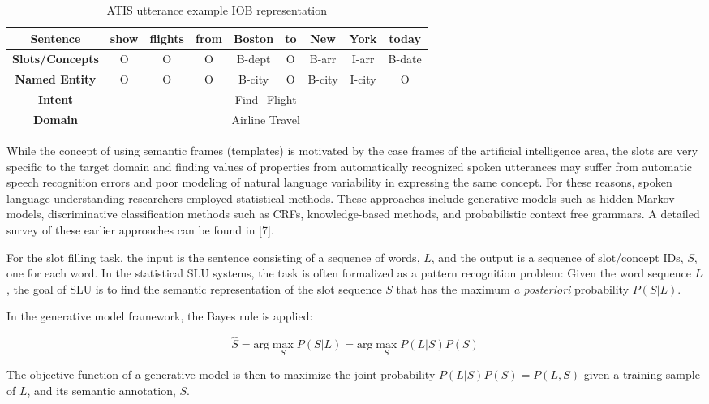 \begin{table}
\begin{tabular}{|c|c|c|c|c|c|c|c|c|}
\hline
{\bf Sentence} & show & flights & from & Boston & to & New & York & today \\
\hline
{\bf Slots/Concepts} & O & O & O & B-dept & O & B-arr & I-arr & B-date \\
\hline
{\bf Named Entity} & O & O & O & B-city & O & B-city & I-city & O \\
\hline
{\bf Intent} & \multicolumn{8}{c|}{Find\_Flight} \\
\hline
{\bf Domain} & \multicolumn{8}{c|}{Airline Travel} \\
\hline
\end{tabular}
\caption{ATIS utterance example IOB representation}
\label{fig:iob}
\end{table}

While the concept of using semantic frames (templates) is motivated by the case
frames of the artificial intelligence area, the slots are very specific to the
target domain and finding values of properties from automatically recognized
spoken utterances may suffer from automatic speech recognition errors and poor
modeling of natural language variability in expressing the same concept. For
these reasons, spoken language understanding researchers employed statistical
methods. These approaches include generative models such as hidden Markov
models, discriminative classification methods such as CRFs, knowledge-based
methods, and probabilistic context free grammars. A detailed survey of these
earlier approaches can be found in [7].

For the slot filling task, the input is the sentence consisting of a sequence
of words, $L$, and the output is a sequence of slot/concept IDs, $S$, one for each
word. In the statistical SLU systems, the task is often formalized as a pattern
recognition problem:  Given the word sequence $L$, the goal of SLU is to find the
semantic representation of the slot sequence $S$ that has the maximum {\it a
posteriori} probability $P(S | L)$. 

In the generative model framework, the Bayes rule is applied:

\begin{equation}
\hat{S} = \textrm{arg}\max_{S} P(S\vert L) = \textrm{arg}\max_{S} P(L \vert S) P (S)
\end{equation}

The objective function of a generative model is then to maximize the joint
probability $P(L | S)P(S) = P(L, S)$ given a training sample of $L$, and its semantic
annotation, $S$.

